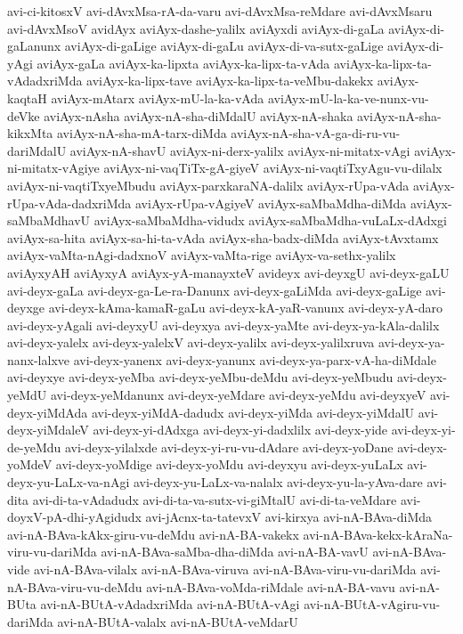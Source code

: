 {avi-ci-kitosxV
avi-dAvxMsa-rA-da-varu
avi-dAvxMsa-reMdare
avi-dAvxMsaru
avi-dAvxMsoV
avidAyx
aviAyx-dashe-yalilx
aviAyxdi
aviAyx-di-gaLa
aviAyx-di-gaLanunx
aviAyx-di-gaLige
aviAyx-di-gaLu
aviAyx-di-va-sutx-gaLige
aviAyx-di-yAgi
aviAyx-gaLa
aviAyx-ka-lipxta
aviAyx-ka-lipx-ta-vAda
aviAyx-ka-lipx-ta-vAdadxriMda
aviAyx-ka-lipx-tave
aviAyx-ka-lipx-ta-veMbu-dakekx
aviAyx-kaqtaH
aviAyx-mAtarx
aviAyx-mU-la-ka-vAda
aviAyx-mU-la-ka-ve-nunx-vu-deVke
aviAyx-nAsha
aviAyx-nA-sha-diMdalU
aviAyx-nA-shaka
aviAyx-nA-sha-kikxMta
aviAyx-nA-sha-mA-tarx-diMda
aviAyx-nA-sha-vA-ga-di-ru-vu-dariMdalU
aviAyx-nA-shavU
aviAyx-ni-derx-yalilx
aviAyx-ni-mitatx-vAgi
aviAyx-ni-mitatx-vAgiye
aviAyx-ni-vaqTiTx-gA-giyeV
aviAyx-ni-vaqtiTxyAgu-vu-dilalx
aviAyx-ni-vaqtiTxyeMbudu
aviAyx-parxkaraNA-dalilx
aviAyx-rUpa-vAda
aviAyx-rUpa-vAda-dadxriMda
aviAyx-rUpa-vAgiyeV
aviAyx-saMbaMdha-diMda
aviAyx-saMbaMdhavU
aviAyx-saMbaMdha-vidudx
aviAyx-saMbaMdha-vuLaLx-dAdxgi
aviAyx-sa-hita
aviAyx-sa-hi-ta-vAda
aviAyx-sha-badx-diMda
aviAyx-tAvxtamx
aviAyx-vaMta-nAgi-dadxnoV
aviAyx-vaMta-rige
aviAyx-va-sethx-yalilx
aviAyxyAH
aviAyxyA
aviAyx-yA-manayxteV
avideyx
avi-deyxgU
avi-deyx-gaLU
avi-deyx-gaLa
avi-deyx-ga-Le-ra-Danunx
avi-deyx-gaLiMda
avi-deyx-gaLige
avi-deyxge
avi-deyx-kAma-kamaR-gaLu
avi-deyx-kA-yaR-vanunx
avi-deyx-yA-daro
avi-deyx-yAgali
avi-deyxyU
avi-deyxya
avi-deyx-yaMte
avi-deyx-ya-kAla-dalilx
avi-deyx-yalelx
avi-deyx-yalelxV
avi-deyx-yalilx
avi-deyx-yalilxruva
avi-deyx-ya-nanx-lalxve
avi-deyx-yanenx
avi-deyx-yanunx
avi-deyx-ya-parx-vA-ha-diMdale
avi-deyxye
avi-deyx-yeMba
avi-deyx-yeMbu-deMdu
avi-deyx-yeMbudu
avi-deyx-yeMdU
avi-deyx-yeMdanunx
avi-deyx-yeMdare
avi-deyx-yeMdu
avi-deyxyeV
avi-deyx-yiMdAda
avi-deyx-yiMdA-dadudx
avi-deyx-yiMda
avi-deyx-yiMdalU
avi-deyx-yiMdaleV
avi-deyx-yi-dAdxga
avi-deyx-yi-dadxlilx
avi-deyx-yide
avi-deyx-yi-de-yeMdu
avi-deyx-yilalxde
avi-deyx-yi-ru-vu-dAdare
avi-deyx-yoDane
avi-deyx-yoMdeV
avi-deyx-yoMdige
avi-deyx-yoMdu
avi-deyxyu
avi-deyx-yuLaLx
avi-deyx-yu-LaLx-va-nAgi
avi-deyx-yu-LaLx-va-nalalx
avi-deyx-yu-la-yAva-dare
avi-dita
avi-di-ta-vAdadudx
avi-di-ta-va-sutx-vi-giMtalU
avi-di-ta-veMdare
avi-doyxV-pA-dhi-yAgidudx
avi-jAcnx-ta-tatevxV
avi-kirxya
avi-nA-BAva-diMda
avi-nA-BAva-kAkx-giru-vu-deMdu
avi-nA-BA-vakekx
avi-nA-BAva-kekx-kAraNa-viru-vu-dariMda
avi-nA-BAva-saMba-dha-diMda
avi-nA-BA-vavU
avi-nA-BAva-vide
avi-nA-BAva-vilalx
avi-nA-BAva-viruva
avi-nA-BAva-viru-vu-dariMda
avi-nA-BAva-viru-vu-deMdu
avi-nA-BAva-voMda-riMdale
avi-nA-BA-vavu
avi-nA-BUta
avi-nA-BUtA-vAdadxriMda
avi-nA-BUtA-vAgi
avi-nA-BUtA-vAgiru-vu-dariMda
avi-nA-BUtA-valalx
avi-nA-BUtA-veMdarU
}
